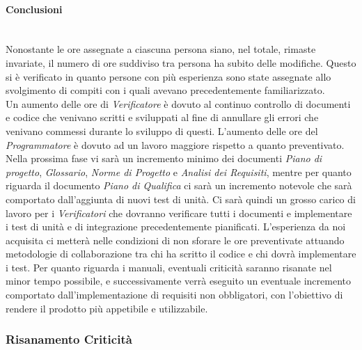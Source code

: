 \paragraph{Conclusioni} ~\\
Nonostante le ore assegnate a ciascuna persona siano, nel totale, rimaste invariate, il numero di ore suddiviso tra persona ha subito delle modifiche. Questo si è verificato in quanto persone con più esperienza sono state assegnate allo svolgimento di compiti con i quali avevano precedentemente familiarizzato. \\
Un aumento delle ore di \textit{Verificatore} è dovuto al continuo controllo di documenti e codice che venivano scritti e sviluppati al fine di annullare gli errori che venivano commessi durante lo sviluppo di questi. L'aumento delle ore del \textit{Programmatore} è dovuto ad un lavoro maggiore rispetto a quanto preventivato. \\
Nella prossima fase vi sarà un incremento minimo dei documenti \textit{Piano di progetto}, \textit{Glossario}, \textit{Norme di Progetto} e \textit{Analisi dei Requisiti}, mentre per quanto riguarda il documento \textit{Piano di Qualifica} ci sarà un incremento notevole che sarà comportato dall'aggiunta di nuovi test di unità. Ci sarà quindi un grosso carico di lavoro per i \textit{Verificatori} che dovranno verificare tutti i documenti e implementare i test di unità e di integrazione precedentemente pianificati. L'esperienza da noi acquisita ci metterà nelle condizioni di non sforare le ore preventivate attuando metodologie di collaborazione tra chi ha scritto il codice e chi dovrà implementare i test. Per quanto riguarda i manuali, eventuali criticità saranno risanate nel minor tempo possibile, e successivamente verrà eseguito un eventuale incremento comportato dall'implementazione di requisiti non obbligatori, con l'obiettivo di rendere il prodotto più appetibile e utilizzabile.\\

\pagebreak


\subsubsection{Risanamento Criticità}
\label{RA3}
